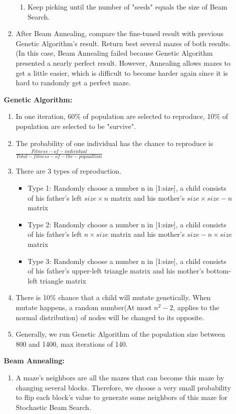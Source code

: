 \documentclass[letter]{article}
\begin{document}
\begin{enumerate}[resume]
\begin{enumerate}
\begin{enumerate}
\begin{enumerate}
					\item {Keep picking until the number of "seeds" equals the size of Beam Search.}
				\end{enumerate}
			
				\item {After Beam Annealing, compare the fine-tuned result with previous Genetic Algorithm's result. Return best several mazes of both results. (In this case, Beam Annealing failed because Genetic Algorithm presented a nearly perfect result. However, Annealing allows mazes to get a little easier, which is difficult to become harder again since it is hard to randomly get a perfect maze.} 
			\end{enumerate} 
		
			\textbf{Genetic Algorithm:} \\
			\begin{enumerate}
				\item {In one iteration, 60\% of population are selected to reproduce, 10\% of population are selected to be "survive". }
				\item {The probability of one individual has the chance to reproduce is $ \frac{Fitness-of-individual}{Total-fitness-of-the-popualtion} $}
				\item {There are 3 types of reproduction. }
				\begin{itemize}
					\item {Type 1: Randomly choose a number n in [1:size], a child consists of his father's left $ size \times n$ matrix and his mother's $ size \times size - n$ matrix}
					\item {Type 2: Randomly choose a number n in [1:size], a child consists of his father's left $ n \times size$ matrix and his mother's $ size - n \times size$ matrix}
					\item {Type 3: Randomly choose a number n in [1:size], a child consists of his father's upper-left triangle matrix and his mother's bottom-left triangle matrix}
				\end{itemize}
				\item {There is 10\% chance that a child will mutate genetically. When mutate happens, a random number(At most $ n^2 - 2$, applies to the normal distribution) of nodes will be changed to its opposite.}
				\item {Generally, we run Genetic Algorithm of the population size between 800 and 1400, max iterations of 140.}
			\end{enumerate}
			
			\textbf{Beam Annealing:} \\
			\begin{enumerate}
				\item {A maze's neighbors are all the mazes that can become this maze by changing several blocks. Therefore, we choose a very small probability to flip each block's value to generate some neighbors of this maze for Stochastic Beam Search.} \\
				

\end{enumerate}
\end{enumerate}
\end{enumerate}
\end{document}
